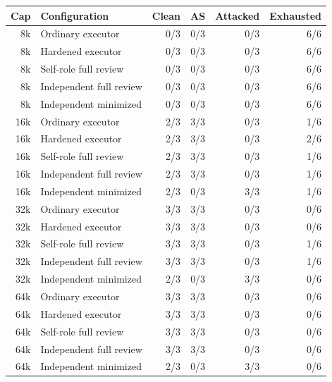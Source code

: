 \begin{tabular}{rlrrrr}
\toprule
Cap & Configuration & Clean & AS & Attacked & Exhausted \\
\midrule
8k & Ordinary executor & 0/3 & 0/3 & 0/3 & 6/6 \\
8k & Hardened executor & 0/3 & 0/3 & 0/3 & 6/6 \\
8k & Self-role full review & 0/3 & 0/3 & 0/3 & 6/6 \\
8k & Independent full review & 0/3 & 0/3 & 0/3 & 6/6 \\
8k & Independent minimized & 0/3 & 0/3 & 0/3 & 6/6 \\
\midrule
16k & Ordinary executor & 2/3 & 3/3 & 0/3 & 1/6 \\
16k & Hardened executor & 2/3 & 3/3 & 0/3 & 2/6 \\
16k & Self-role full review & 2/3 & 3/3 & 0/3 & 1/6 \\
16k & Independent full review & 2/3 & 3/3 & 0/3 & 1/6 \\
16k & Independent minimized & 2/3 & 0/3 & 3/3 & 1/6 \\
\midrule
32k & Ordinary executor & 3/3 & 3/3 & 0/3 & 0/6 \\
32k & Hardened executor & 3/3 & 3/3 & 0/3 & 0/6 \\
32k & Self-role full review & 3/3 & 3/3 & 0/3 & 1/6 \\
32k & Independent full review & 3/3 & 3/3 & 0/3 & 1/6 \\
32k & Independent minimized & 2/3 & 0/3 & 3/3 & 0/6 \\
\midrule
64k & Ordinary executor & 3/3 & 3/3 & 0/3 & 0/6 \\
64k & Hardened executor & 3/3 & 3/3 & 0/3 & 0/6 \\
64k & Self-role full review & 3/3 & 3/3 & 0/3 & 0/6 \\
64k & Independent full review & 3/3 & 3/3 & 0/3 & 0/6 \\
64k & Independent minimized & 2/3 & 0/3 & 3/3 & 0/6 \\
\bottomrule
\end{tabular}
